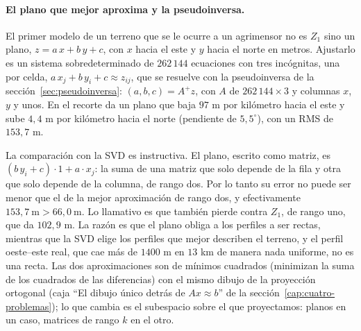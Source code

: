 \paragraph{El plano que mejor aproxima y la pseudoinversa.} El primer modelo de un terreno que se le
ocurre a un agrimensor no es \(Z_1\) sino un plano, \(z=a\,x+b\,y+c\), con \(x\) hacia el este
y \(y\) hacia el norte en metros. Ajustarlo es un sistema sobredeterminado de \(262\,144\)
ecuaciones con tres incógnitas, una por celda, \(a\,x_j+b\,y_i+c\approx z_{ij}\), que se
resuelve con la pseudoinversa de la sección~\ref{sec:pseudoinversa}: \((a,b,c)=A^{+}z\), con
\(A\) de \(262\,144\times3\) y columnas \(x\), \(y\) y unos. En el recorte da un plano que baja
\(97\) m por kilómetro hacia el este y sube \(4{,}4\) m por kilómetro hacia el norte
(pendiente de \(5{,}5^\circ\)), con un RMS de \(153{,}7\) m.

La comparación con la SVD es instructiva. El plano, escrito como matriz, es
\((b\,y_i+c)\cdot1+a\cdot x_j\): la suma de una matriz que solo depende de la fila y otra que
solo depende de la columna, de rango dos. Por lo tanto su error no puede ser menor que el de la
mejor aproximación de rango dos, y efectivamente \(153{,}7\ \text{m}>66{,}0\ \text{m}\). Lo
llamativo es que también pierde contra \(Z_1\), de rango uno, que da \(102{,}9\) m. La razón
es que el plano obliga a los perfiles a ser rectas, mientras que la SVD elige los perfiles que
mejor describen el terreno, y el perfil oeste--este real, que cae más de \(1400\) m en
\(13\) km de manera nada uniforme, no es una recta. Las dos aproximaciones son de mínimos cuadrados (minimizan la suma de los
cuadrados de las diferencias) con el mismo dibujo de la proyección ortogonal (caja \enquote{El dibujo único detrás de \(Ax\approx b\)}
de la sección~\ref{cap:cuatro-problemas}); lo que cambia es el subespacio sobre el que
proyectamos: planos en un caso, matrices de rango \(k\) en el otro.

